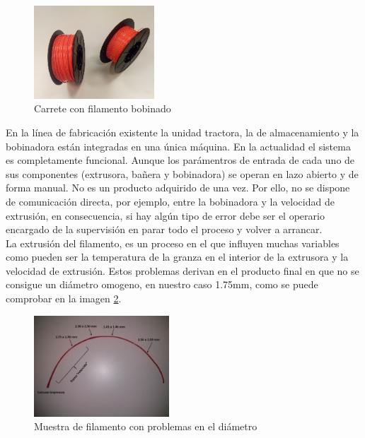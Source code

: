 \begin{itemize}
    \begin{figure}[H]
    	\centering
    	\includegraphics[width=0.4\textwidth]{images/carretes.png}
    	\caption{Carrete con filamento bobinado}
    	\label{fig:intro_carrete}
	\end{figure}
\end{itemize}

En la línea de fabricación existente la unidad tractora, la de almacenamiento y la bobinadora están integradas en una única máquina. En la actualidad el sistema es completamente funcional. Aunque los parámentros de entrada de cada uno de sus componentes (extrusora, bañera y bobinadora) se operan en lazo abierto y de forma manual. No es un producto adquirido de una vez. Por ello, no se dispone de comunicación directa, por ejemplo, entre la bobinadora y la velocidad de extrusión, en consecuencia, si hay algún tipo de error debe ser el operario encargado de la supervisión en parar todo el proceso y volver a arrancar.\\

La extrusión del filamento, es un proceso en el que influyen muchas variables como pueden ser la temperatura de la granza en el interior de la extrusora y la velocidad de extrusión. Estos problemas derivan en el producto final en que no se consigue un diámetro omogeno, en nuestro caso 1.75mm, como se puede comprobar en la imagen \ref{fig:muestra_filamento}.

   \begin{figure}[H]
        \centering
        \includegraphics[width=0.45\textwidth]{images/atasco_rojo.jpg}
        \caption{Muestra de filamento con problemas en el diámetro}
        \label{fig:muestra_filamento}
    \end{figure}

